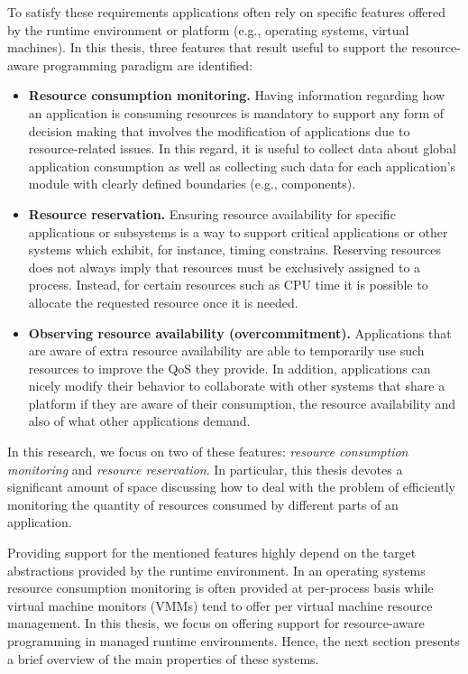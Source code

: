 To satisfy these requirements applications often rely on specific features offered by the runtime environment or platform (e.g., operating systems, virtual machines).
In this thesis, three features that result useful to support the resource-aware programming paradigm are identified:

\begin{itemize}
\item \textbf{Resource consumption monitoring.}
Having information regarding how an application is consuming resources is mandatory to support any form of decision making that involves the modification of applications due to resource-related issues. 
In this regard, it is useful to collect data about global application consumption as well as collecting such data for each application's module with clearly defined boundaries (e.g., components).

\item \textbf{Resource reservation.}
Ensuring resource availability for specific applications or subsystems is a way to support critical applications or other systems which exhibit, for instance, timing constrains.
Reserving resources does not always imply that resources must be exclusively assigned to a process.
Instead, for certain resources such as CPU time it is possible to allocate the requested resource once it is needed.

\item \textbf{Observing resource availability (overcommitment).} 
Applications that are aware of extra resource availability are able to temporarily use such resources to improve the QoS they provide.
In addition, applications can nicely modify their behavior to collaborate with other systems that share a platform if they are aware of their consumption, the resource availability and also of what other applications demand.
\end{itemize}

In this research, we focus on two of these features: \textit{resource consumption monitoring} and \textit{resource reservation}.
In particular, this thesis devotes a significant amount of space discussing how to deal with the problem of efficiently monitoring the quantity of resources consumed by different parts of an application.

%
%

Providing support for the mentioned features highly depend on the target abstractions provided by the runtime environment.
In an operating systems resource consumption monitoring is often provided at per-process basis while
virtual machine monitors (VMMs) tend to offer per virtual machine resource management.
In this thesis, we focus on offering support for resource-aware programming in managed runtime environments.
Hence, the next section presents a brief overview of the main properties of these systems. 

